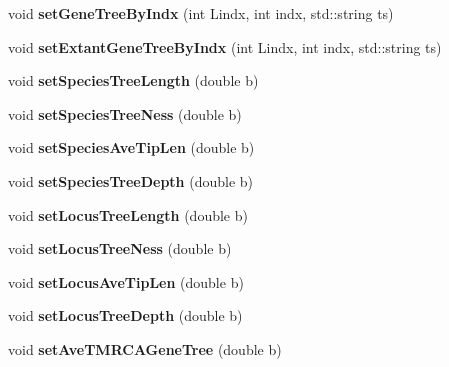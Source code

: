 \begin{DoxyCompactItemize}
\item 
\mbox{\label{class_tree_info_a210124b610317a42b2e016b328582b30}} 
void {\bfseries set\+Gene\+Tree\+By\+Indx} (int Lindx, int indx, std\+::string ts)
\item 
\mbox{\label{class_tree_info_a89af7855cad9530eebb204bc843f46cb}} 
void {\bfseries set\+Extant\+Gene\+Tree\+By\+Indx} (int Lindx, int indx, std\+::string ts)
\item 
\mbox{\label{class_tree_info_a95f5c0764015478acb0a1ce61cc185f0}} 
void {\bfseries set\+Species\+Tree\+Length} (double b)
\item 
\mbox{\label{class_tree_info_a2d985fc20e362d40ccf3472d55f25997}} 
void {\bfseries set\+Species\+Tree\+Ness} (double b)
\item 
\mbox{\label{class_tree_info_ab6dd316c60ab321e1b58889d15d0d665}} 
void {\bfseries set\+Species\+Ave\+Tip\+Len} (double b)
\item 
\mbox{\label{class_tree_info_af7bbba5ab2b151d18593765bb30889e9}} 
void {\bfseries set\+Species\+Tree\+Depth} (double b)
\item 
\mbox{\label{class_tree_info_a3761922d622d5a1baeac1e706bf25b84}} 
void {\bfseries set\+Locus\+Tree\+Length} (double b)
\item 
\mbox{\label{class_tree_info_a2f692222e034f9581e9ddd27896d40fa}} 
void {\bfseries set\+Locus\+Tree\+Ness} (double b)
\item 
\mbox{\label{class_tree_info_a85d4f0671b072440e44e19607376357b}} 
void {\bfseries set\+Locus\+Ave\+Tip\+Len} (double b)
\item 
\mbox{\label{class_tree_info_ae7bc08749c4ab96733b66b85f354573d}} 
void {\bfseries set\+Locus\+Tree\+Depth} (double b)
\item 
\mbox{\label{class_tree_info_a9adaf906c4a63185e6c5a879b2d19f25}} 
void {\bfseries set\+Ave\+T\+M\+R\+C\+A\+Gene\+Tree} (double b)

\end{DoxyCompactItemize}
